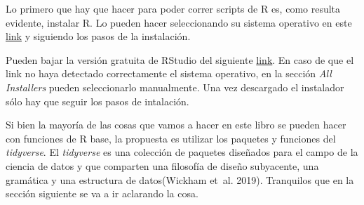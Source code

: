 \documentclass[
  letterpaper,
  DIV=11,
  numbers=noendperiod,
  oneside]{scrreprt}
\begin{document}
\begin{tcolorbox}[enhanced jigsaw, breakable, rightrule=.15mm, colbacktitle=quarto-callout-tip-color!10!white, bottomtitle=1mm, arc=.35mm, titlerule=0mm, left=2mm, toprule=.15mm, leftrule=.75mm, colback=white, opacitybacktitle=0.6, opacityback=0, colframe=quarto-callout-tip-color-frame, bottomrule=.15mm, coltitle=black, toptitle=1mm, title=\textcolor{quarto-callout-tip-color}{\faLightbulb}\hspace{0.5em}{Instalación de R y RStudio}]
Lo primero que hay que hacer para poder correr scripts de R es, como
resulta evidente, instalar R. Lo pueden hacer seleccionando su sistema
operativo en este \href{http://mirror.fcaglp.unlp.edu.ar/CRAN/}{link} y
siguiendo los pasos de la instalación.

Pueden bajar la versión gratuita de RStudio del siguiente
\href{https://www.rstudio.com/products/rstudio/download/\#download}{link}.
En caso de que el link no haya detectado correctamente el sistema
operativo, en la sección \emph{All Installers} pueden seleccionarlo
manualmente. Una vez descargado el instalador sólo hay que seguir los
pasos de intalación.
\end{tcolorbox}

Si bien la mayoría de las cosas que vamos a hacer en este libro se
pueden hacer con funciones de R base, la propuesta es
utilizar los paquetes y funciones del \emph{tidyverse}. El
\emph{tidyverse} es una colección de paquetes diseñados para el campo de
la ciencia de datos y que comparten una filosofía de diseño subyacente,
una gramática y una estructura de datos(Wickham et~al.
2019).
Tranquilos que en la sección siguiente se va a ir aclarando la cosa.
\end{document}
